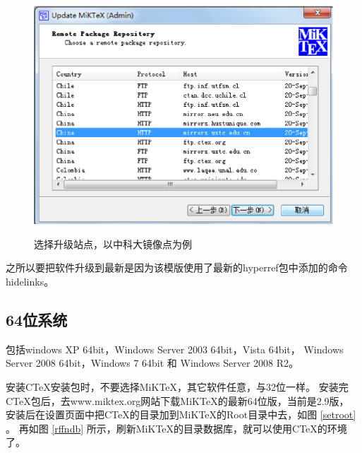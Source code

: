 \begin{figure}[th]
\centering
\includegraphics[scale=0.5]{./Pictures/set3.eps}\\
\caption{选择升级站点，以中科大镜像点为例}
\label{set3}
\end{figure}

之所以要把软件升级到最新是因为该模版使用了最新的hyperref包中添加的命令hidelinks。

\subsection{64位系统}

包括windows XP 64bit，Windows Server 2003 64bit，Vista 64bit，
Windows Server 2008 64bit，Windows 7 64bit 和 Windows Server 2008 R2。

安装CTeX安装包时，不要选择MiKTeX，其它软件任意，与32位一样。
安装完CTeX包后，去www.miktex.org网站下载MiKTeX的最新64位版，当前是2.9版，
安装后在设置页面中把CTeX的目录加到MiKTeX的Root目录中去，如图 \ref{setroot} 。
再如图 \ref{rffndb} 所示，刷新MiKTeX的目录数据库，就可以使用CTeX的环境了。

